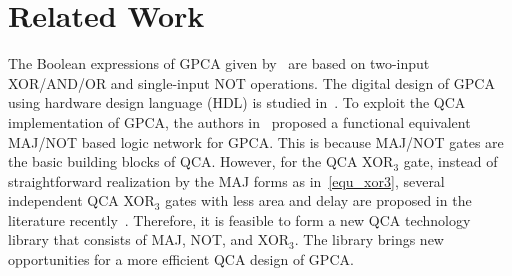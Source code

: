 \documentclass[9pt,journal,compsoc]{IEEEtran}
\begin{document}
%
 
   



\vspace{-3ex}
\section{Related Work}\vspace{-1ex}
The Boolean expressions of GPCA given by~\cite{4} are based on two-input XOR/AND/OR and single-input NOT operations.
The digital design of GPCA using hardware design language (HDL) is studied in~\cite{singh2014simulation}.
To exploit the QCA implementation of GPCA, the authors in~\cite{2} proposed a functional equivalent MAJ/NOT based logic network for GPCA. This is because MAJ/NOT gates are the basic building blocks of QCA. 
However, for the QCA XOR$_3$ gate, instead of straightforward realization by the MAJ forms as in~\eqref{equ_xor3}, several independent QCA XOR$_3$ gates with less area and delay are proposed in the literature recently~\cite{3,roshany2019novel}.    
Therefore, it is feasible to form a new QCA technology library that consists of MAJ, NOT, and XOR$_3$.
The library brings new opportunities for a more efficient QCA design of GPCA. 
\end{document}
